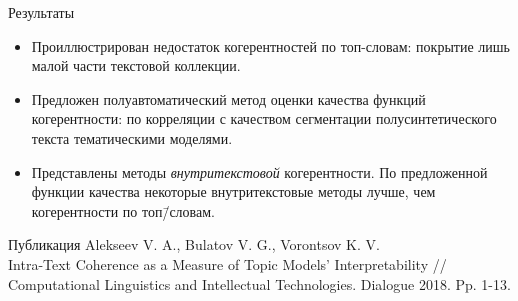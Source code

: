 \documentclass[sans, mathsans, russian]{beamer}
\begin{document}
\begin{frame}{Результаты}
  \begin{itemize}%
  \item Проиллюстрирован недостаток когерентностей по топ-словам: покрытие лишь малой части текстовой коллекции.

  \item Предложен полуавтоматический метод оценки качества функций когерентности: по корреляции с качеством сегментации полусинтетического текста тематическими моделями.

  \item Представлены методы \emph{внутритекстовой} когерентности.
    По предложенной функции качества некоторые внутритекстовые методы лучше, чем когерентности по топ\=/словам.
  \end{itemize}
  
  \begin{block}{Публикация}
    Alekseev V. A., Bulatov V. G., Vorontsov K. V.\\Intra-Text Coherence as a Measure of Topic Models' Interpretability // Computational Linguistics and Intellectual Technologies. Dialogue 2018. Pp. 1-13.
  \end{block}
\end{frame}
\end{document}
